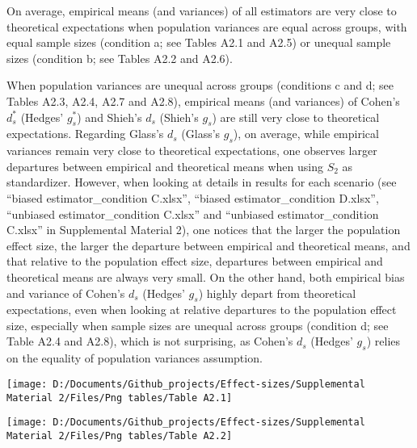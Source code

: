 \documentclass[
  english,
  man,mask]{apa6}
\begin{document}
On average, empirical means (and variances) of all estimators are very close to theoretical expectations when population variances are equal across groups, with equal sample sizes (condition a; see Tables A2.1 and A2.5) or unequal sample sizes (condition b; see Tables A2.2 and A2.6).

When population variances are unequal across groups (conditions c and d; see Tables A2.3, A2.4, A2.7 and A2.8), empirical means (and variances) of Cohen's \(d^*_s\) (Hedges' \(g^*_s\)) and Shieh's \(d_s\) (Shieh's \(g_s\)) are still very close to theoretical expectations. Regarding Glass's \(d_s\) (Glass's \(g_s\)), on average, while empirical variances remain very close to theoretical expectations, one observes larger departures between empirical and theoretical means when using \(S_2\) as standardizer. However, when looking at details in results for each scenario (see \enquote{biased estimator\_condition C.xlsx}, \enquote{biased estimator\_condition D.xlsx}, \enquote{unbiased estimator\_condition C.xlsx} and \enquote{unbiased estimator\_condition C.xlsx} in Supplemental Material 2), one notices that the larger the population effect size, the larger the departure between empirical and theoretical means, and that relative to the population effect size, departures between empirical and theoretical means are always very small. On the other hand, both empirical bias and variance of Cohen's \(d_s\) (Hedges' \(g_s\)) highly depart from theoretical expectations, even when looking at relative departures to the population effect size, especially when sample sizes are unequal across groups (condition d; see Table A2.4 and A2.8), which is not surprising, as Cohen's \(d_s\) (Hedges' \(g_s\)) relies on the equality of population variances assumption.

\begin{sidewaysfigure}

{\centering \texttt{[image: D:/Documents/Github\_projects/Effect-sizes/Supplemental Material 2/Files/Png tables/Table A2.1]} 

}

\end{sidewaysfigure}

\begin{sidewaysfigure}

{\centering \texttt{[image: D:/Documents/Github\_projects/Effect-sizes/Supplemental Material 2/Files/Png tables/Table A2.2]} 

}

\end{sidewaysfigure}
\end{document}
